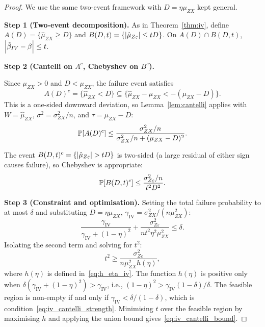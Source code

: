 \begin{proof}
    We use the same two-event framework with $D = \eta\mu_{ZX}$ kept general.

    \medskip\noindent\textbf{Step 1 (Two-event decomposition).}
    As in Theorem~\ref{thm:iv}, define $A(D) = \{\hat{\mu}_{ZX}\geq D\}$ and $B(D,t) = \{\left|\hat{\mu}_{Z\varepsilon}\right|\leq tD\}$.
    On $A(D)\cap B(D,t)$, $\left|\hat\beta_{IV}-\beta\right|\leq t$.

    \medskip\noindent\textbf{Step 2 (Cantelli on $A^c$, Chebyshev on $B^c$).}

    Since $\mu_{ZX}>0$ and $D<\mu_{ZX}$, the failure event satisfies
    \[
        A(D)^c = \{\hat{\mu}_{ZX} < D\}
        \subseteq
        \{\hat{\mu}_{ZX} - \mu_{ZX} < -(\mu_{ZX}-D)\}.
    \]
    This is a one-sided downward deviation, so Lemma~\ref{lem:cantelli} applies with $W=\hat{\mu}_{ZX}$, $\sigma^2=\sigma_{ZX}^2/n$, and $\tau=\mu_{ZX}-D$:
    \[
        \operatorname{\mathbb{P}}[A(D)^c]
        \leq
        \frac{\sigma_{ZX}^2/n}{\sigma_{ZX}^2/n + (\mu_{ZX}-D)^2}.
    \]

    The event $B(D,t)^c = \{\abs{\hat{\mu}_{Z\varepsilon}}>tD\}$ is two-sided (a large residual of either sign causes failure), so Chebyshev is appropriate:
    \[
        \operatorname{\mathbb{P}}[B(D,t)^c] \leq \frac{\sigma_{Z\varepsilon}^2/n}{t^2 D^2}.
    \]

    \medskip\noindent\textbf{Step 3 (Constraint and optimisation).}
    Setting the total failure probability to at most $\delta$ and substituting $D=\eta\mu_{ZX}$, $\gamma_{\mathrm{IV}}=\sigma_{ZX}^2/(n\mu_{ZX}^2)$:
    \[
        \frac{\gamma_{\mathrm{IV}}}{\gamma_{\mathrm{IV}}+(1-\eta)^2}
        + \frac{\sigma_{Z\varepsilon}^2}{n t^2\eta^2\mu_{ZX}^2}
        \leq \delta.
    \]
    Isolating the second term and solving for $t^2$:
    \[
        t^2 \geq \frac{\sigma_{Z\varepsilon}^2}{n\mu_{ZX}^2h(\eta)},
    \]
    where $h(\eta)$ is defined in~\eqref{eq:h_eta_iv}. The function $h(\eta)$ is positive only when $\delta(\gamma_{\mathrm{IV}}+(1-\eta)^2)>\gamma_{\mathrm{IV}}$, i.e., $(1-\eta)^2>\gamma_{\mathrm{IV}}(1-\delta)/\delta$. The feasible region is non-empty if and only if $\gamma_{\mathrm{IV}}<\delta/(1-\delta)$, which is condition~\eqref{eq:iv_cantelli_strength}. Minimising $t$ over the feasible region by maximising $h$ and applying the union bound gives~\eqref{eq:iv_cantelli_bound}.
\end{proof}

